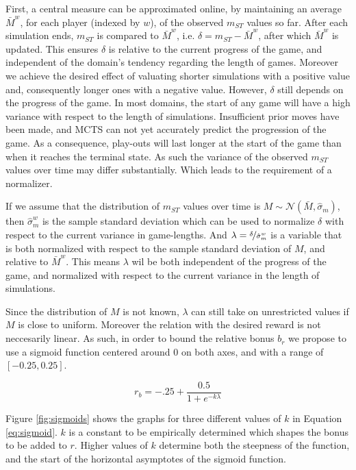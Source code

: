 \documentclass{ecai2010}
\begin{document}
First, a central measure can be approximated online, by maintaining an average $\bar{M}^w$, for each player (indexed by $w$), of the observed $m_{ST}$ values so far. After each simulation ends, $m_{ST}$ is compared to $\bar{M}^w$, i.e. $\delta = m_{ST} - \bar{M}^w$, after which $\bar{M}^w$ is updated. This ensures $\delta$ is relative to the current progress of the game, and independent of the domain's tendency regarding the length of games. Moreover we achieve the desired effect of valuating shorter simulations with a positive value and, consequently longer ones with a negative value. However, $\delta$ still depends on the progress of the game. In most domains, the start of any game will have a high variance with respect to the length of simulations. Insufficient prior moves have been made, and MCTS can not yet accurately predict the progression of the game. As a consequence, play-outs will last longer at the start of the game than when it reaches the terminal state. As such the variance of the observed $m_{ST}$ values over time may differ substantially. Which leads to the requirement of a normalizer.

If we assume that the distribution of $m_{ST}$ values over time is $M \sim \mathcal{N}(\bar{M}, \hat{\sigma}_m)$, then $\hat{\sigma}^w_m$ is the sample standard deviation which can be used to normalize $\delta$ with respect to the current variance in game-lengths. And $\lambda = \nicefrac{\delta}{\hat{\sigma}^w_m}$ is a variable that is both normalized with respect to the sample standard deviation of $M$, and relative to $\bar{M}^w$. This means $\lambda$ wil be both independent of the progress of the game, and normalized with respect to the current variance in the length of simulations.

Since the distribution of $M$ is not known, $\lambda$ can still take on unrestricted values if $M$ is close to uniform. Moreover the relation with the desired reward is not neccesarily linear. As such, in order to bound the relative bonus $b_r$ we propose to use a sigmoid function centered around $0$ on both axes, and with a range of $[-0.25, 0.25]$. 

\begin{equation}
r_b = -.25 + \frac{0.5}{1+e^{-k\lambda}}
\label{eq:sigmoid}
\end{equation}

Figure \ref{fig:sigmoids} shows the graphs for three different values of $k$ in Equation \ref{eq:sigmoid}. $k$ is a constant to be empirically determined which shapes the bonus to be added to $r$. Higher values of $k$ determine both the steepness of the function, and the start of the horizontal asymptotes of the sigmoid function.
\end{document}
